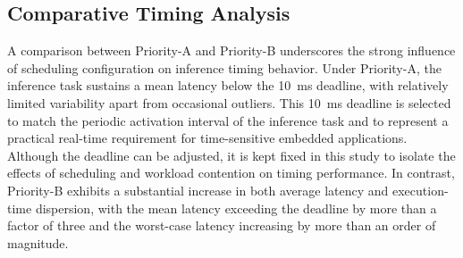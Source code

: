 \documentclass[conference]{IEEEtran}
\begin{document}
\subsection{Comparative Timing Analysis}

A comparison between Priority-A and Priority-B underscores the strong influence of scheduling configuration on inference timing behavior. Under Priority-A, the inference task sustains a mean latency below the 10~ms deadline, with relatively limited variability apart from occasional outliers. %
This 10~ms deadline is selected to match the periodic activation interval of the inference task and to represent a practical real-time requirement for time-sensitive embedded applications. Although the deadline can be adjusted, it is kept fixed in this study to isolate the effects of scheduling and workload contention on timing performance. In contrast, Priority-B exhibits a substantial increase in both average latency and execution-time dispersion, with the mean latency exceeding the deadline by more than a factor of three and the worst-case latency increasing by more than an order of magnitude.

\end{document}

